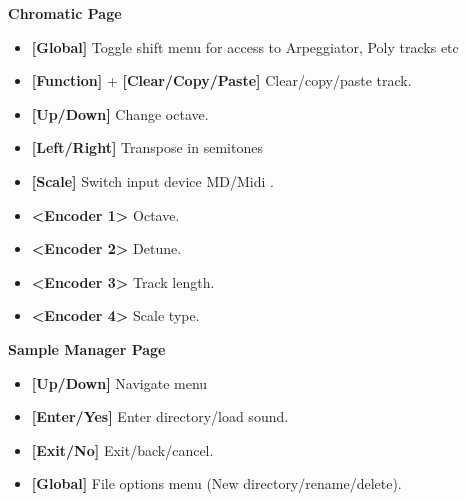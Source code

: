 \textbf{Chromatic Page}
      \begin{itemize}
      \item \textbf{[Global] }Toggle shift menu for access to Arpeggiator, Poly tracks etc
      \item \textbf{[Function]} + \textbf{[Clear/Copy/Paste]} Clear/copy/paste track.
      \item \textbf{[Up/Down]} Change octave.
      \item \textbf{[Left/Right]} Transpose in semitones
      \item \textbf{[Scale]} Switch input device MD/Midi .
      \item \textbf{<Encoder 1>} Octave.
      \item \textbf{<Encoder 2>} Detune.
      \item \textbf{<Encoder 3>} Track length.
      \item \textbf{<Encoder 4>} Scale type.
      \end{itemize}
\newpage
\textbf{Sample Manager Page} 
\begin{itemize}

     \item \textbf{[Up/Down] }Navigate menu
     \item \textbf{[Enter/Yes]} Enter directory/load sound.
     \item \textbf{[Exit/No]} Exit/back/cancel.
     \item \textbf{[Global] }File options menu (New directory/rename/delete).
     \end{itemize}

